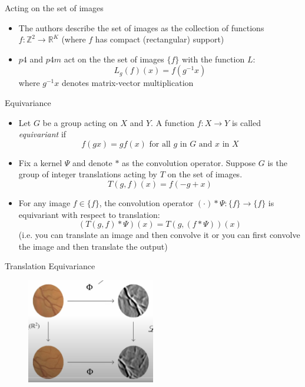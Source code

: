 \documentclass{beamer}
\newcommand{\R}{\mathbb{R}}
\newcommand{\Z}{\mathbb{Z}}
\begin{document}
\begin{frame}{Acting on the set of images}
    \begin{itemize}
        \item The authors describe the set of images as the collection of functions $f: \Z^2 \to \R^K$ (where $f$ has compact (rectangular) support)
        \item $p4$ and $p4m$ act on the the set of images $\{f\}$ with the function $L$:
        $$L_g(f)(x) = f(g^{-1}x)$$
        where $g^{-1}x$ denotes matrix-vector multiplication
    \end{itemize}
\end{frame}

\begin{frame}{Equivariance}
    \begin{itemize}
        \item Let $G$ be a group acting on $X$ and $Y$.  A function $f:X \to Y$ is called \emph{equivariant} if 
        $$f(gx) = gf(x) \text{ for all $g$ in $G$ and $x$ in $X$}$$
        \item Fix a kernel $\Psi$ and denote $*$ as the convolution operator.  Suppose $G$ is the group of integer translations acting by $T$ on the set of images. 
         $$T(g,f)(x)= f(-g + x)$$ 
        \item For any image $f\in \{f\}$, the convolution operator $(\cdot)*\Psi: \{f\} \to \{f\}$ is equivariant with respect to translation:
        $$ (T(g, f) * \Psi)(x) = T(g, (f * \Psi))(x)$$
        (i.e. you can translate an image and then convolve it or you can first convolve the image and then translate the output)
    \end{itemize}
\end{frame}

\begin{frame}{Translation Equivariance}
    \begin{figure}
        \centering
        \includegraphics[width=0.5\textwidth, height=0.5\textheight]{Screenshot 2024-01-13 at 11.31.21 AM.png}
    \end{figure}
\end{frame}
\end{document}
